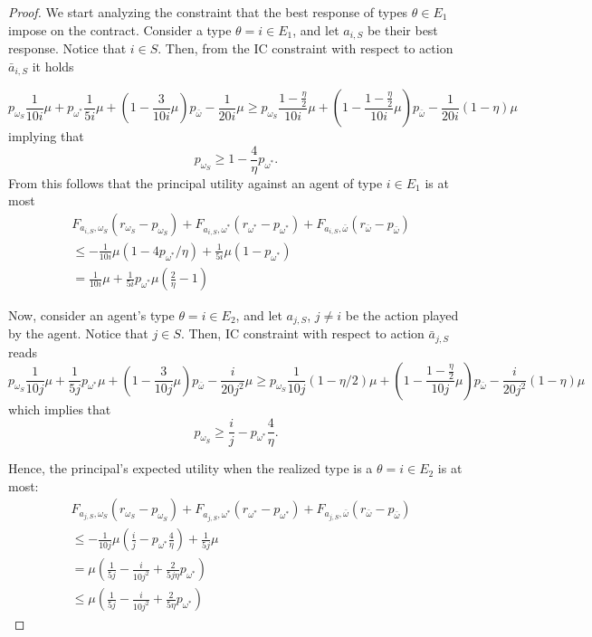 \begin{proof}
	We start analyzing the constraint that the best response of types $\theta \in E_1$ impose on the contract.
	Consider a type $\theta=i \in E_1$, and let $a_{i,S}$ be their best response. Notice that $i\in S$.
	Then, from the IC constraint with respect to action $\bar a_{i,S}$ it holds
	
	\[
	p_{\omega_{S}}\frac{1}{10i}\mu + p_{\omega^*}  \frac{1}{5i}\mu+(1-\frac{3}{10i}\mu)p_{\bar\omega}- \frac{1}{20i}\mu \ge  p_{\omega_{S}}\frac{1-\frac{\eta}{2}}{10i} \mu +(1-\frac{1-\frac{\eta}{2}}{10i}\mu)p_{\bar\omega}- \frac{1}{20i} (1-\eta) \mu 
	\]
	implying that
	\[
	p_{\omega_{S}}\ge 1-\frac{4}{\eta}p_{\omega^*}.
	\]
	From this follows that the principal utility against an agent of type $i\in E_1$ is at most
	\begin{align}
	&F_{a_{i,S},\omega_S}(r_{\omega_S}-p_{\omega_S})+F_{a_{i,S},\omega^*}(r_{\omega^*}-p_{\omega^*})+F_{a_{i,S},\bar \omega}(r_{\bar \omega}-p_{\bar\omega})\\
	&\le-\frac{1}{10i}\mu(1-4p_{\omega^*}/\eta)+\frac{1}{5i}\mu(1-p_{\omega^*})\\
	&=\frac{1}{10i}\mu+\frac{1}{5i}p_{\omega^*}\mu(\frac{2}{\eta}-1)
	\end{align}
	
	Now, consider an agent's type $\theta=i\in E_2$, and let $a_{j,S}$, $j \neq i$ be the action played by the agent. 
	Notice that $j \in S$. Then, IC constraint with respect to action $\bar a_{j,S}$ reads
	\[
	p_{\omega_{S}} \frac{1}{10j} \mu + \frac{1}{5j}p_{\omega^*}\mu+(1-\frac{3}{10j}\mu)p_{\bar\omega}- \frac{i}{20j^2}\mu \ge p_{\omega_{S}} \frac{1}{10j} (1-\eta/2) \mu+(1-\frac{1-\frac{\eta}{2}}{10j}\mu)p_{\bar\omega}- \frac{i}{20j^2} (1-\eta) \mu
	\]
	which implies that
	\[
	p_{\omega_{S}} \ge \frac{i}{j}- p_{\omega^*} \frac{4}{\eta}. 
	\]
	
	Hence, the principal's expected utility when the realized type is a $\theta=i \in E_2$ is at most:
	\begin{align}
		&F_{a_{j,S},\omega_S}(r_{\omega_S}-p_{\omega_S})+F_{a_{j,S},\omega^*}(r_{\omega^*}-p_{\omega^*})+F_{a_{j,S},\bar \omega}(r_{\bar \omega}-p_{\bar\omega})\\
		&\le-\frac{1}{10j}\mu\left( \frac{i}{j}- p_{\omega^*} \frac{4}{\eta}\right)+\frac{1}{5j}\mu\\
		&=\mu\left(\frac{1}{5j}-\frac{i}{10j^2}+\frac{2}{5j\eta}p_{\omega^*}\right)\\
		&\le\mu\left(\frac{1}{5j}-\frac{i}{10j^2}+\frac{2}{5\eta}p_{\omega^*}\right)
	\end{align}
	

\end{proof}
